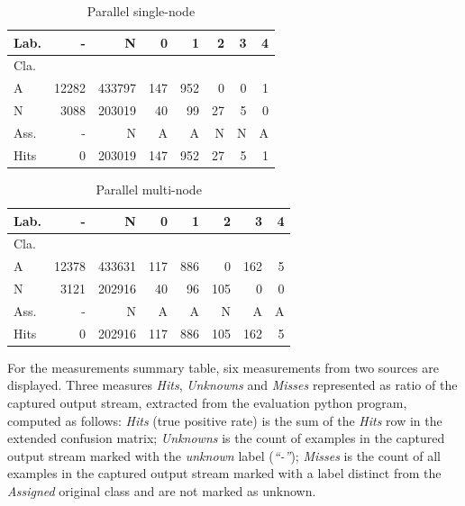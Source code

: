 \begin{table}[h]%
{\scriptsize
\setlength\tabcolsep{0.35em}
\begin{center}
\caption{Parallel single-node}
\label{tab:single-node-matrix}
\begin{tabular}{l|r|r|r|r|r|r|r}
  Lab. &      - &       N &    0 &    1 &   2 &  3 &  4 \\\hline
  Cla.  &        &         &      &      &     &    &    \\\hline
  \hline
  A        &  12282 &  433797 &  147 &  952 &   0 &  0 &  1 \\\hline
  N        &   3088 &  203019 &   40 &   99 &  27 &  5 &  0 \\\hline
  \hline
  Ass. &      - &       N &    A &    A &   N &  N &  A \\\hline
  Hits     &      0 &  203019 &  147 &  952 &  27 &  5 &  1 
\end{tabular}
\end{center}
}
\end{table}
% 
% 
\begin{table}[h]%
{\scriptsize
\setlength\tabcolsep{0.35em}
\begin{center}
\caption{Parallel multi-node}
\label{tab:multi-node-matrix}
\begin{tabular}{l|r|r|r|r|r|r|r}
  Lab.   &      - &       N &    0 &    1 &    2 &    3 &  4 \\\hline
  Cla.   &        &         &      &      &      &      &    \\\hline
  \hline
  A      &  12378 &  433631 &  117 &  886 &    0 &  162 &  5 \\\hline
  N      &   3121 &  202916 &   40 &   96 &  105 &    0 &  0 \\\hline
  \hline
  Ass.   &      - &       N &    A &    A &    N &    A &  A \\\hline
  Hits   &      0 &  202916 &  117 &  886 &  105 &  162 &  5 
\end{tabular}
\end{center}
}
\end{table}


For the measurements summary table, six measurements from two sources are displayed. Three
measures \emph{Hits}, \emph{Unknowns} and \emph{Misses} represented as ratio of
the captured output stream, extracted from the evaluation python program,
computed as follows:
\emph{Hits} (true positive rate) is the sum of the \emph{Hits} row in the
extended confusion matrix;
\emph{Unknowns} is the count of examples in the captured output stream marked
with the \emph{unknown} label (\emph{``-''});
\emph{Misses} is the count of all examples in the captured output stream marked
with a label distinct from the \emph{Assigned} original class and are not marked
as unknown.

